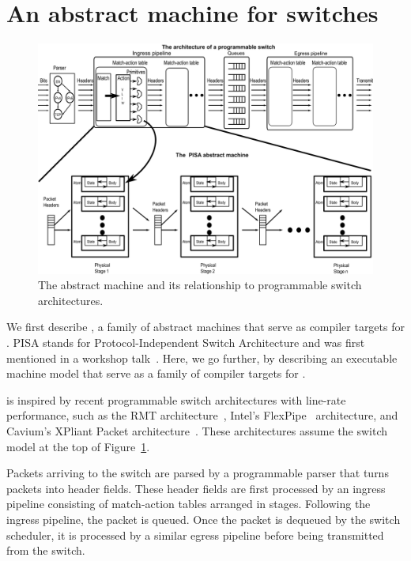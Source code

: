 \section{An abstract machine for switches}
\label{s:absmachine}

\begin{figure}[!t]
  \includegraphics[width=\textwidth]{pisa.pdf}
  \caption{The \absmachine abstract machine and its relationship to
  programmable switch architectures.}
  \label{fig:switch}
\end{figure}

We first describe \absmachine, a family of abstract machines that serve as
compiler targets for \pktlanguage. PISA stands for Protocol-Independent Switch
Architecture and was first mentioned in a workshop talk~\cite{nick_p4}. Here,
we go further, by describing an executable machine model that serve as a family
of compiler targets for \pktlanguage.

\absmachine is inspired by recent programmable switch architectures with
line-rate performance, such as the RMT architecture~\cite{rmt}, Intel's
FlexPipe~\cite{flexpipe} architecture, and Cavium's XPliant Packet
architecture~\cite{xpliant}. These architectures assume the switch model at the
top of Figure~\ref{fig:switch}.

Packets arriving to the switch are parsed by a programmable parser that turns
packets into header fields. These header fields are first processed by an
ingress pipeline consisting of match-action tables arranged in stages.
Following the ingress pipeline, the packet is queued. Once the packet is
dequeued by the switch scheduler, it is processed by a similar egress pipeline
before being transmitted from the switch.

